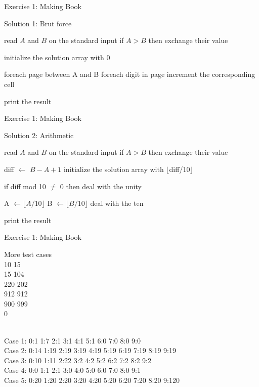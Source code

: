 \documentclass[handout]{beamer}
\begin{document}
\begin{frame}[fragile]{Exercise 1: Making Book}

  \begin{code}{Solution 1: Brut force}
    \begin{PseudoCode}
read $A$ and $B$ on the standard input
if $A > B$ then 
    exchange their value

initialize the solution array with 0

foreach page between A and B
    foreach digit in page
        increment the corresponding cell

print the result
    \end{PseudoCode}
  \end{code}
\end{frame}

\begin{frame}[fragile]{Exercise 1: Making Book}
  
  \begin{code}{Solution 2: Arithmetic}
    \begin{PseudoCode}
read $A$ and $B$ on the standard input
if $A > B$ then exchange their value

diff $\leftarrow$ $B - A + 1$
initialize the solution array with $\lfloor$diff/10$\rfloor$
    
if diff mod 10 $\neq$ 0 then
    deal with the unity
    
A $\leftarrow \lfloor A / 10 \rfloor$
B $\leftarrow \lfloor B / 10 \rfloor$
deal with the ten

print the result
    \end{PseudoCode}
  \end{code}
\end{frame}

\begin{frame}{Exercise 1: Making Book}

  \begin{exampleblock}{More test cases}
    \\
    10 15\\
    15 104\\
    220 202\\
    912 912\\
    900 999\\
    0
    
    \medskip
    \\
    Case 1: 0:1 1:7 2:1 3:1 4:1 5:1 6:0 7:0 8:0 9:0\\
    Case 2: 0:14 1:19 2:19 3:19 4:19 5:19 6:19 7:19 8:19 9:19\\
    Case 3: 0:10 1:11 2:22 3:2 4:2 5:2 6:2 7:2 8:2 9:2\\
    Case 4: 0:0 1:1 2:1 3:0 4:0 5:0 6:0 7:0 8:0 9:1\\
    Case 5: 0:20 1:20 2:20 3:20 4:20 5:20 6:20 7:20 8:20 9:120
  \end{exampleblock}
\end{frame}
\end{document}

